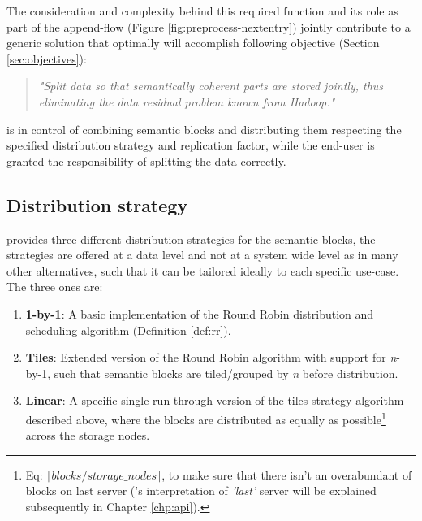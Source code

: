 The consideration and complexity behind this required function and its role as part of the append-flow (Figure \ref{fig:preprocess-nextentry}) jointly contribute to a generic solution that optimally will accomplish following objective (Section \ref{sec:objectives}): 

\begin{quotation}
	\textit{"Split data so that semantically coherent parts are stored jointly, thus eliminating the data residual problem known from Hadoop."}
\end{quotation}
\vspace*{3mm}

\CodeName is in control of combining semantic blocks and distributing them respecting the specified distribution strategy and replication factor, while the end-user is granted the responsibility of splitting the data correctly.

\subsection{Distribution strategy}
\CodeName provides three different distribution strategies for the semantic blocks, the strategies are offered at a data level and not at a system wide level as in many other alternatives, such that it can be tailored ideally to each specific use-case. The three ones are:

\begin{enumerate}
	\item \textbf{1-by-1}: A basic implementation of the Round Robin distribution and scheduling algorithm (Definition \ref{def:rr}).
	\item \textbf{Tiles}: Extended version of the Round Robin algorithm with support for \textit{n}-by-1, such that semantic blocks are tiled/grouped by \textit{n} before distribution.
	\item \textbf{Linear}: A specific single run-through version of the tiles strategy algorithm described above, where the blocks are distributed as equally as possible\footnote{ Eq: $\lceil blocks / storage\_nodes\rceil$, to make sure that there isn't an overabundant of blocks on last server (\CodeNameShort's interpretation of \textit{'last'} server will be explained subsequently in Chapter \ref{chp:api}).} across the storage nodes.
\end{enumerate}
\vspace*{5mm}

